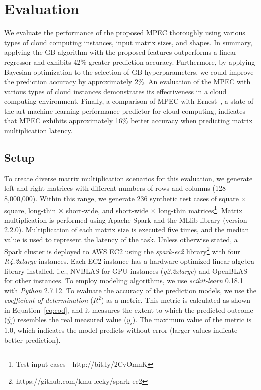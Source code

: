 \documentclass[10pt, conference, compsocconf]{IEEEtran}
\begin{document}
\section{Evaluation}{\label{sec:eval}}
We evaluate the performance of the proposed MPEC thoroughly using various types of cloud computing instances, input matrix sizes, and shapes. In summary, applying the GB algorithm with the proposed features outperforms a linear regressor and exhibits  42\% greater prediction accuracy. Furthermore, by applying Bayesian optimization to the selection of GB hyperparameters, we could improve the prediction accuracy by approximately 2\%. An evaluation of the MPEC with various types of cloud instances demonstrates its effectiveness in a cloud computing environment. Finally, a comparison of MPEC with Ernest~\cite{ernest}, a state-of-the-art machine learning performance predictor for cloud computing, indicates that MPEC exhibits approximately 16\% better accuracy when predicting matrix multiplication latency.

\subsection{Setup}
To create diverse matrix multiplication scenarios for this evaluation, we generate left and right matrices with different numbers of rows and columns (128-8,000,000). Within this range, we generate 236 synthetic test cases of square $\times$ square, long-thin $\times$ short-wide, and short-wide $\times$ long-thin matrices\footnote{Test input cases - http://bit.ly/2CvOmnK}. Matrix multiplication is performed using Apache Spark and the MLlib library (version 2.2.0). Multiplication of each matrix size is executed five times, and the median value is used to represent the latency of the task. Unless otherwise stated, a Spark cluster is deployed to AWS EC2 using the \textit{spark-ec2} library\footnote{https://github.com/kmu-leeky/spark-ec2} with four \textit{R4.2xlarge} instances. Each EC2 instance has a hardware-optimized linear algebra library installed, i.e., NVBLAS for GPU instances (\textit{g2.2xlarge}) and OpenBLAS for other instances. To employ modeling algorithms, we use \textit{scikit-learn} 0.18.1 with \textit{Python} 2.7.12. To evaluate the accuracy of the prediction models, we use the \textit{coefficient of determination} ($R^2$) as a metric. This metric is calculated as shown in Equation~\ref{eq:cod}, and it measures the extent to which the predicted outcome ($\hat{y_i}$) resembles the real measured value ($y_i$). The maximum value of the metric is $1.0$, which indicates the model predicts without error (larger values indicate better prediction).
\end{document}
